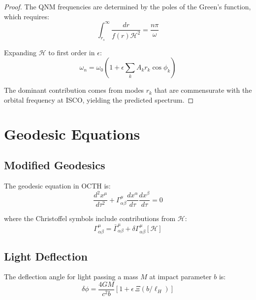 \documentclass[12pt,a4paper]{article}
\begin{document}
\begin{proof}
The QNM frequencies are determined by the poles of the Green's function, which requires:
\begin{equation}
    \int_{r_s}^{\infty} \frac{dr}{f(r)\mathcal{H}^2} = \frac{n\pi}{\omega}
\end{equation}

Expanding $\mathcal{H}$ to first order in $\epsilon$:
\begin{equation}
    \omega_n = \omega_0 \left(1 + \epsilon \sum_k A_k r_k \cos\phi_k\right)
\end{equation}

The dominant contribution comes from modes $r_k$ that are commensurate with the orbital frequency at ISCO, yielding the predicted spectrum.
\end{proof}

\section{Geodesic Equations}

\subsection{Modified Geodesics}

The geodesic equation in OCTH is:
\begin{equation}
    \frac{d^2x^\mu}{d\tau^2} + \Gamma^\mu_{\alpha\beta}\frac{dx^\alpha}{d\tau}\frac{dx^\beta}{d\tau} = 0
\end{equation}

where the Christoffel symbols include contributions from $\mathcal{H}$:
\begin{equation}
    \Gamma^\mu_{\alpha\beta} = \bar{\Gamma}^\mu_{\alpha\beta} + \delta\Gamma^\mu_{\alpha\beta}[\mathcal{H}]
\end{equation}

\subsection{Light Deflection}

The deflection angle for light passing a mass $M$ at impact parameter $b$ is:
\begin{equation}
    \delta\phi = \frac{4GM}{c^2 b}\left[1 + \epsilon\,\Xi(b/\ell_H)\right]
\end{equation}
\end{document}
